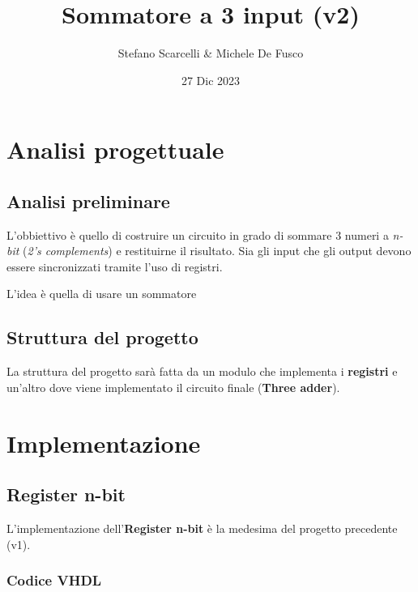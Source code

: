 \documentclass[12pt]{article}
\title{Sommatore a 3 input (v2)}
\author{Stefano Scarcelli \& Michele De Fusco}
\date{27 Dic 2023}
\begin{document}
\maketitle
\newpage

\tableofcontents
\newpage


\section{Analisi progettuale}
    \subsection{Analisi preliminare}
        L'obbiettivo è quello di costruire un circuito in grado di sommare 3 numeri a \textit{n-bit} (\textit{2's complements}) e restituirne il risultato. Sia gli input che gli output devono essere sincronizzati tramite l'uso di registri.

        L'idea è quella di usare un sommatore 
    
    \subsection{Struttura del progetto}
        La struttura del progetto sarà fatta da un modulo che implementa i \textbf{registri} e un'altro dove viene implementato il circuito finale (\textbf{Three adder}).

\section{Implementazione}
    \subsection{Register n-bit}
        L'implementazione dell'\textbf{Register n-bit} è la medesima del progetto precedente (v1).

        \subsubsection{Codice VHDL}
           
            
\end{document}
